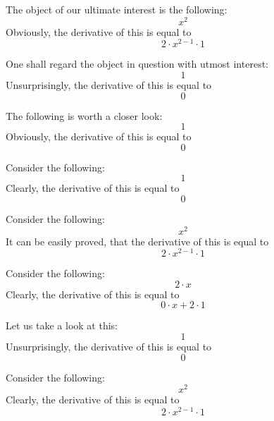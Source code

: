 \documentclass{article}
\begin{document}
The object of our ultimate interest is the following:
\begin{equation}
x ^{2 } 
\end{equation}
Obviously, the derivative of this is equal to
\begin{equation}
2 \cdot x ^{2 - 1 } \cdot 1 
\end{equation}

One shall regard the object in question with utmost interest:
\begin{equation}
1 
\end{equation}
Unsurprisingly, the derivative of this is equal to
\begin{equation}
0 
\end{equation}

The following is worth a closer look:
\begin{equation}
1 
\end{equation}
Obviously, the derivative of this is equal to
\begin{equation}
0 
\end{equation}

Consider the following:
\begin{equation}
1 
\end{equation}
Clearly, the derivative of this is equal to
\begin{equation}
0 
\end{equation}

Consider the following:
\begin{equation}
x ^{2 } 
\end{equation}
It can be easily proved, that the derivative of this is equal to
\begin{equation}
2 \cdot x ^{2 - 1 } \cdot 1 
\end{equation}

Consider the following:
\begin{equation}
2 \cdot x 
\end{equation}
Clearly, the derivative of this is equal to
\begin{equation}
0 \cdot x + 2 \cdot 1 
\end{equation}

Let us take a look at this:
\begin{equation}
1 
\end{equation}
Unsurprisingly, the derivative of this is equal to
\begin{equation}
0 
\end{equation}

Consider the following:
\begin{equation}
x ^{2 } 
\end{equation}
Clearly, the derivative of this is equal to
\begin{equation}
2 \cdot x ^{2 - 1 } \cdot 1 
\end{equation}
\end{document}
